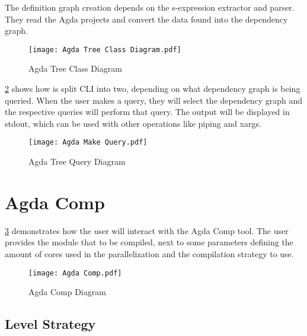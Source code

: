 The definition graph creation depends on the s-expression extractor and parser.
They read the Agda projects and convert the data found into the dependency
graph.

\begin{figure}[H]
    \centering
    \texttt{[image: Agda Tree Class Diagram.pdf]}
    \caption{Agda Tree Class Diagram}
    \label{fig:Agda Tree Class Diagram}
\end{figure} 
    
\pagebreak

\cref{fig:Agda Tree Query Diagram} shows how is split CLI into two, depending
on what dependency graph is being queried. When the user makes a query, they
will select the dependency graph and the respective queries will perform that
query. The output will be displayed in stdout, which can be used with other
operations like piping and xargs.

\begin{figure}[H]
    \centering
    \texttt{[image: Agda Make Query.pdf]}
    \caption{Agda Tree Query Diagram}
    \label{fig:Agda Tree Query Diagram}
\end{figure} 

\pagebreak 


\section{Agda Comp}

\cref{fig:Agda Comp Diagram} demonstrates how the user will interact with
the Agda Comp tool. The user provides the module that to be compiled, next to some
parameters defining the amount of cores used in the parallelization and the
compilation strategy to use.
\begin{figure}[H]
    \centering 
    \texttt{[image: Agda Comp.pdf]}
    \caption{Agda Comp Diagram}
    \label{fig:Agda Comp Diagram}
\end{figure} 

\pagebreak
\subsection{Level Strategy} \label{sub:design level strategy}

